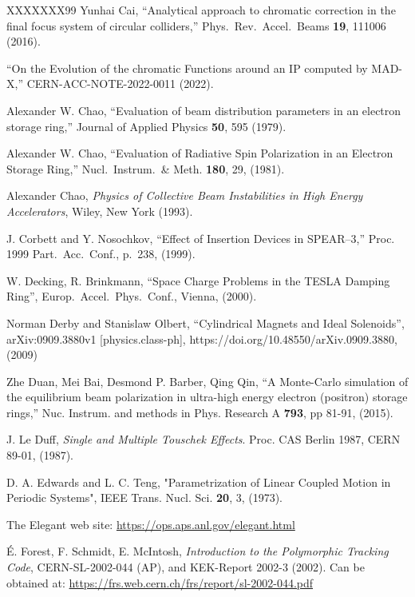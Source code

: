 \begin{thebibliography}{XXXXXXX99}
Yunhai Cai,
``Analytical approach to chromatic correction in the final focus system of circular colliders,''
Phys.~Rev.~Accel.~Beams {\bf 19}, 111006 (2016).

``On the Evolution of the chromatic Functions around an IP computed by MAD-X,''
CERN-ACC-NOTE-2022-0011 (2022).

Alexander W. Chao, 
``Evaluation of beam distribution parameters in an electron storage ring,''
Journal of Applied Physics {\bf 50}, 595 (1979).

Alexander W. Chao, 
``Evaluation of Radiative Spin Polarization in an Electron Storage Ring,''
Nucl.\ Instrum.\ \& Meth. {\bf 180}, 29, (1981).

Alexander Chao, 
{\em Physics of Collective Beam Instabilities in High Energy Accelerators}, 
Wiley, New York (1993). 

J. Corbett and Y. Nosochkov, ``Effect of Insertion Devices in SPEAR--3,''
Proc. 1999 Part.\ Acc.\ Conf., p.~238, (1999).

W. Decking, R. Brinkmann, 
``Space Charge Problems in the TESLA Damping Ring'',
Europ.\ Accel.\ Phys.\ Conf., Vienna, (2000).

Norman Derby and Stanislaw Olbert, 
``Cylindrical Magnets and Ideal Solenoids'',
arXiv:0909.3880v1 [physics.class-ph],
https://doi.org/10.48550/arXiv.0909.3880, (2009)


Zhe Duan, Mei Bai, Desmond P. Barber, Qing Qin, 
``A Monte-Carlo simulation of the equilibrium beam polarization in ultra-high energy electron
(positron) storage rings,''
Nuc. Instrum. and methods in Phys. Research A {\bf 793}, pp 81-91, (2015).

  J. Le Duff, \emph{Single and Multiple Touschek Effects}.
  Proc. CAS Berlin 1987,
  CERN 89-01, (1987).

D. A. Edwards and L. C. Teng, 
"Parametrization of Linear Coupled Motion in Periodic Systems",
IEEE Trans. Nucl. Sci. {\bf 20}, 3, (1973).

The Elegant web site:
\hfill\break
\hspace*{0.3in} \url{https://ops.aps.anl.gov/elegant.html}

\'E. Forest, F. Schmidt, E. McIntosh, 
{\it Introduction to the Polymorphic Tracking Code}, 
CERN-SL-2002-044 (AP), and KEK-Report 2002-3 (2002). 
Can be obtained at:
\hfill\break
\hspace*{0.3in}
\url{https://frs.web.cern.ch/frs/report/sl-2002-044.pdf}


\end{thebibliography}
